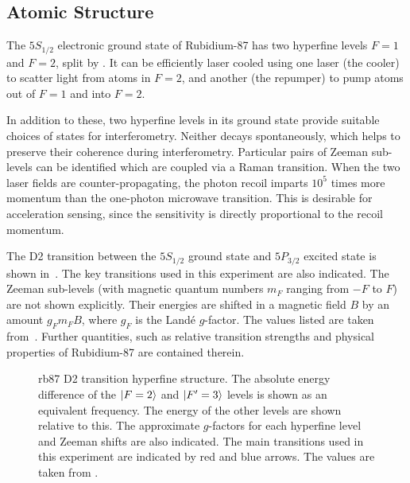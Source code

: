 \subsection{Atomic Structure}\label{subsec:theory_atomic}
The $5S_{1/2}$ electronic ground state of Rubidium-87 has two
hyperfine levels $F=1$ and $F=2$, split by . 
It can be efficiently laser
cooled using one laser (the cooler) to scatter light from atoms in
$F=2$, and another (the repumper) to pump atoms out of $F=1$ and into
$F=2$.
\par\noindent
In addition to these, two hyperfine
levels in its ground state provide suitable choices of states for
interferometry. Neither decays 
spontaneously, which helps to preserve their coherence during
interferometry. Particular pairs of Zeeman sub-levels can be
identified which are coupled via a Raman transition. When the two
laser fields are counter-propagating, the photon recoil imparts $10^5$
times more momentum
than the one-photon  microwave transition. This is desirable for
acceleration sensing, since the sensitivity is directly proportional to
the recoil momentum. 
\par\noindent
The D2 transition between the $5S_{1/2}$ ground state and $5P_{3/2}$
excited state is
shown in~. The key transitions used in
this experiment are also indicated. The Zeeman sub-levels (with
magnetic quantum numbers $m_F$ ranging from $-F$ to $F$) are not
shown explicitly. Their energies are shifted in a magnetic field
$B$ by an amount $g_F m_F B$, where $g_F$ is the Land\'e $g$-factor.
The values listed are taken
from~\cite{Steck2001}. Further quantities, such as relative transition
strengths and physical properties of Rubidium-87 are contained
therein. 
\begin{figure}[htpb]
  \centering
  \resizebox{0.8\textwidth}{!}{}
  \caption[Rubidium-87 D2 transition hyperfine structure.]{\ac{rb87} D2 transition hyperfine structure. The absolute
    energy difference of the $\ket{F=2}$ and $\ket{F'=3}$ levels is shown
    as an equivalent frequency. The energy of the other levels are
    shown relative to this. The
  approximate $g$-factors for each hyperfine level and Zeeman
shifts are also indicated. The main transitions used in this
experiment are indicated by red and blue arrows. The values are taken
from \cite{Steck2001}.} 
  \label{fig:rb87_hyperfine}
\end{figure}
